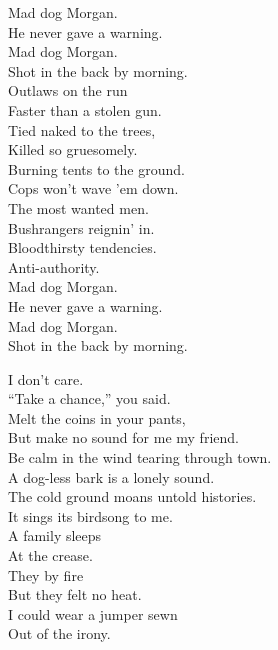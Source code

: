 Mad dog Morgan. \\
He never gave a warning. \\
Mad dog Morgan. \\
Shot in the back by morning. \\

Outlaws on the run \\
Faster than a stolen gun. \\
Tied naked to the trees, \\
Killed so gruesomely. \\

Burning tents to the ground. \\
Cops won't wave 'em down. \\
The most wanted men. \\
Bushrangers reignin' in. \\

Bloodthirsty tendencies. \\
Anti-authority. \\

Mad dog Morgan. \\
He never gave a warning. \\
Mad dog Morgan. \\
Shot in the back by morning. \\





I don't care. \\
``Take a chance,'' you said. \\
Melt the coins in your pants, \\
But make no sound for me my friend. \\

Be calm in the wind tearing through town. \\
A dog-less bark is a lonely sound. \\

The cold ground moans untold histories. \\
It sings its birdsong to me. \\

A family sleeps \\
At the crease. \\
They  by fire \\
But they felt no heat. \\
I could wear a jumper sewn \\
Out of the irony. \\

